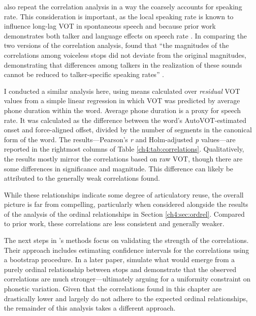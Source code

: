 \citet{chodroff_2017_structure} also repeat the correlation analysis in a way the coarsely accounts for speaking rate. This consideration is important, as the local speaking rate is known to influence long-lag VOT in spontaneous speech \citep{stuartsmith_2015_private} and because prior work demonstrates both talker and language effects on speech rate \citep{bradlow_2017_rate}. In comparing the two versions of the correlation analysis, \citeauthor{chodroff_2017_structure} found that ``the magnitudes of the correlations among voiceless stops did not deviate from the original magnitudes, demonstrating that differences among talkers in the realization of these sounds cannot be reduced to talker-specific speaking rates'' \citeyearpar[][p. 34]{chodroff_2017_structure}. 

I conducted a similar analysis here, using means calculated over \textit{residual} VOT values from a simple linear regression in which VOT was predicted by average phone duration within the word. Average phone duration is a proxy for speech rate. It was calculated as the difference between the word's AutoVOT-estimated onset and force-aligned offset, divided by the number of segments in the canonical form of the word. The results---Pearson's \textit{r} and Holm-adjusted \textit{p} values---are reported in the rightmost columns of Table \ref{ch4:tab:correlations}. Qualitatively, the results mostly mirror the correlations based on raw VOT, though there are some differences in significance and magnitude. This difference can likely be attributed to the generally weak correlations found. 

While these relationships indicate some degree of articulatory reuse, the overall picture is far from compelling, particularly when considered alongside the results of the analysis of the ordinal relationships in Section \ref{ch4:sec:ordrel}. Compared to prior work, these correlations are less consistent and generally weaker.

The next steps in \citeauthor{chodroff_2017_structure}'s \citeyearpar{chodroff_2017_structure} methods focus on validating the strength of the correlations. Their approach includes estimating confidence intervals for the correlations using a bootstrap procedure. In a later paper, \citet{chodroff_2019_covariation} simulate what would emerge from a purely ordinal relationship between stops and demonstrate that the observed correlations are much stronger—ultimately arguing for a uniformity constraint on phonetic variation. Given that the correlations found in this chapter are drastically lower and largely do not adhere to the expected ordinal relationships, the remainder of this analysis takes a different approach.

